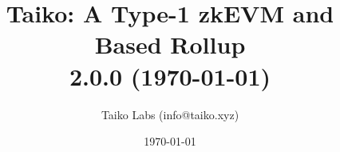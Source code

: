 \documentclass[9pt,oneside]{amsart}
\date{\today}
\title[Taiko: A Type-1 zkEVM and Based Rollup\\ \smaller
\textbf{{2.0.0}}]{Taiko: A Type-1 zkEVM and Based Rollup \\ \smaller \textbf{{2.0.0 (\today)}}}
\author{Taiko Labs (info@taiko.xyz)}
\begin{document}


\maketitle

\setlength{\columnsep}{20pt}
\begin{multicols}{2}



















\end{multicols}



\appendix



\end{document}
